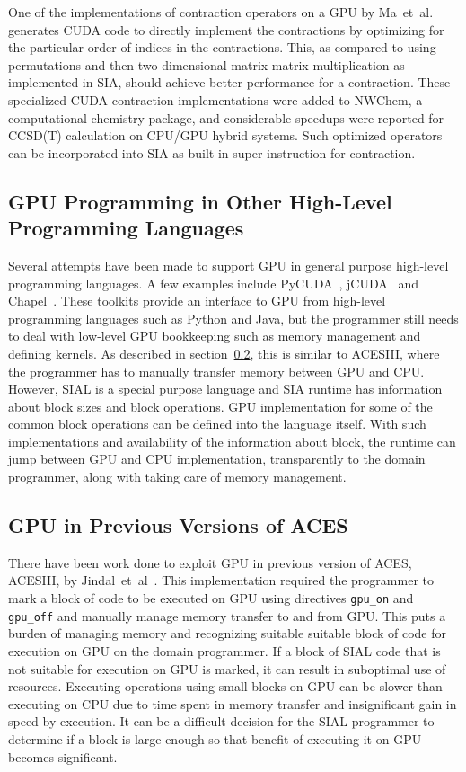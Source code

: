 One of the implementations of contraction operators on a GPU by
Ma~et~al.~\cite{Ma2013} generates CUDA code to directly implement the contractions
by optimizing for the particular order of indices in the contractions. This, as
compared to using permutations and then two-dimensional matrix-matrix multiplication
as implemented in SIA, should achieve better performance for a contraction. These
specialized CUDA contraction implementations were added to NWChem, a computational
chemistry package, and considerable speedups were reported for CCSD(T) calculation
on CPU/GPU hybrid systems. Such optimized operators can be incorporated into SIA
as built-in super instruction for contraction.

\subsection{GPU Programming in Other High-Level Programming Languages}
Several attempts have been made to support GPU in general purpose high-level programming
languages. A few examples include PyCUDA~\cite{pycuda2011},
jCUDA~\cite{jcuda2009} and Chapel~\cite{chapelgpu}. These toolkits provide an interface
to GPU from high-level programming languages such as Python and Java, but the
programmer still needs to deal with low-level GPU bookkeeping such as memory
management and defining kernels. As described in section~\ref{relatedworkacesiiigpu},
this is similar to ACESIII, where the programmer has to manually transfer memory
between GPU and CPU. However, SIAL is a special purpose language and SIA runtime
has information about block sizes and block operations. GPU implementation for
some of the common block operations can be defined into the language itself. With
such implementations and availability of the information about block, the runtime can jump between
GPU and CPU implementation, transparently to the domain programmer, along with taking
care of memory management.

\subsection{GPU in Previous Versions of ACES}\label{relatedworkacesiiigpu}
There have been work done to exploit GPU in previous version of ACES, ACESIII,
by Jindal~et~al~\cite{Jindal2016}. This implementation
required the programmer to mark a block of code to be executed on GPU using
directives \texttt{gpu\_on} and \texttt{gpu\_off} and manually manage memory
transfer to and from GPU. This puts a burden of managing memory and recognizing
suitable suitable block of code for execution on GPU on the domain programmer.
If a block of SIAL code that is not suitable for execution on GPU is marked, it can result
in suboptimal use of resources. Executing operations using small blocks on GPU can
be slower than executing on CPU due to time spent in memory transfer and
insignificant gain in speed by execution. It can be a difficult decision for the
SIAL programmer to determine if a block is large enough so that benefit of executing
it on GPU becomes significant.

